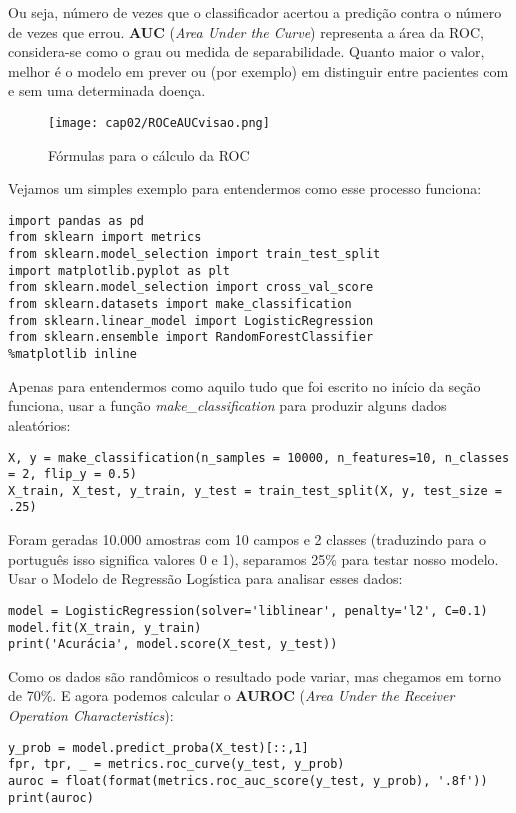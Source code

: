 Ou seja, número de vezes que o classificador acertou a predição contra o número de vezes que errou. \textbf{AUC} (\textit{Area Under the Curve}) representa a área da ROC, considera-se como o grau ou medida de separabilidade. Quanto maior o valor, melhor é o modelo em prever ou (por exemplo) em distinguir entre pacientes com e sem uma determinada doença.
\begin{figure}[H]
	\centering
	\texttt{[image: cap02/ROCeAUCvisao.png]}
	\caption{Fórmulas para o cálculo da ROC}
\end{figure}

Vejamos um simples exemplo para entendermos como esse processo funciona:
\begin{lstlisting}[]
import pandas as pd
from sklearn import metrics
from sklearn.model_selection import train_test_split
import matplotlib.pyplot as plt
from sklearn.model_selection import cross_val_score
from sklearn.datasets import make_classification
from sklearn.linear_model import LogisticRegression
from sklearn.ensemble import RandomForestClassifier
%matplotlib inline
\end{lstlisting}

Apenas para entendermos como aquilo tudo que foi escrito no início da seção funciona, usar a função \textit{make\_classification} para produzir alguns dados aleatórios:
\begin{lstlisting}[]
X, y = make_classification(n_samples = 10000, n_features=10, n_classes = 2, flip_y = 0.5)
X_train, X_test, y_train, y_test = train_test_split(X, y, test_size = .25)
\end{lstlisting}

Foram geradas 10.000 amostras com 10 campos e 2 classes (traduzindo para o português isso significa valores 0 e 1), separamos 25\% para testar nosso modelo. Usar o Modelo de Regressão Logística para analisar esses dados:
\begin{lstlisting}[]
model = LogisticRegression(solver='liblinear', penalty='l2', C=0.1)
model.fit(X_train, y_train)
print('Acurácia', model.score(X_test, y_test))
\end{lstlisting}

Como os dados são randômicos o resultado pode variar, mas chegamos em torno de 70\%. E agora podemos calcular o \textbf{AUROC} (\textit{Area Under the Receiver Operation Characteristics}):
\begin{lstlisting}[]
y_prob = model.predict_proba(X_test)[::,1]
fpr, tpr, _ = metrics.roc_curve(y_test, y_prob)
auroc = float(format(metrics.roc_auc_score(y_test, y_prob), '.8f'))
print(auroc)
\end{lstlisting}

